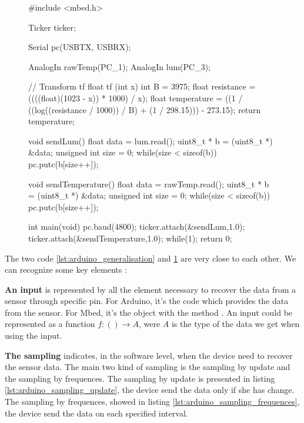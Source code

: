 \begin{figure}[ht]
  \centering
\begin{scalacode}
#include <mbed.h>

Ticker ticker;

Serial pc(USBTX, USBRX);

AnalogIn rawTemp(PC_1);
AnalogIn lum(PC_3);

 // Transform tf
float tf (int x){
  int B = 3975;
  float resistance = ((((float)(1023 - x)) * 1000) / x);
  float temperature = ((1 / ((log((resistance / 1000)) / B) + (1 / 298.15))) - 273.15);
  return temperature;
}

void sendLum(){
  float data = lum.read();
  uint8_t * b = (uint8_t *) &data;
  unsigned int size = 0;
  while(size < sizeof(b)) {
      pc.putc(b[size++]);
  }
}

void sendTemperature(){
  float data = rawTemp.read();
  uint8_t * b = (uint8_t *) &data;
  unsigned int size = 0;
  while(size < sizeof(b)) {
    pc.putc(b[size++]);
  }
}

int main(void) {
  pc.baud(4800);
  ticker.attach(&sendLum,1.0);
  ticker.attach(&sendTemperature,1.0);
  while(1);
  return 0;
}
\end{scalacode}
  \caption[Mbed code for a simple data recovering]{}
  \label{lst:mbed_generalisation}
\end{figure}

The two code \ref{lst:arduino_generalisation} and \ref{lst:mbed_generalisation}
are very close to each other. We can recognize some key elements :

\textbf{An input} is represented by all the element necessary to recover the
data from a sensor through specific pin. For Arduino, it's the code
 which provides the data from the sensor. For
Mbed, it's the object  with the method .
An input could be represented as a function $f : () \rightarrow A$, were $A$ is
the type of the data we get when using the input.

\textbf{The sampling} indicates, in the software level, when the device need
to recover the sensor data. The main two kind of sampling is the sampling by
update and the sampling by frequences. The sampling by update is presented in
listing \ref{lst:arduino_sampling_update}, the device send the data only if she has
change. The sampling by frequences, showed in listing
\ref{lst:arduino_sampling_frequences}, the device send the data on each
specified interval.

